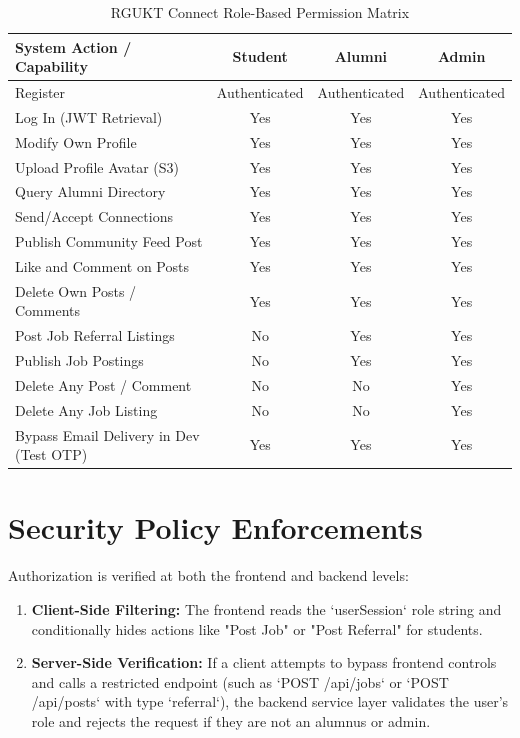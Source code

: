 \begin{table}[H]
    \centering
    \caption{RGUKT Connect Role-Based Permission Matrix}
    \label{tab:permission_matrix}
    \begin{tabularx}{\textwidth}{l c c c}
        \toprule
        \textbf{System Action / Capability} & \textbf{Student} & \textbf{Alumni} & \textbf{Admin} \\
        \midrule
        Register & Authenticated & Authenticated & Authenticated \\
        Log In (JWT Retrieval) & Yes & Yes & Yes \\
        Modify Own Profile & Yes & Yes & Yes \\
        Upload Profile Avatar (S3) & Yes & Yes & Yes \\
        Query Alumni Directory & Yes & Yes & Yes \\
        Send/Accept Connections & Yes & Yes & Yes \\
        Publish Community Feed Post & Yes & Yes & Yes \\
        Like and Comment on Posts & Yes & Yes & Yes \\
        Delete Own Posts / Comments & Yes & Yes & Yes \\
        Post Job Referral Listings & No & Yes & Yes \\
        Publish Job Postings & No & Yes & Yes \\
        Delete Any Post / Comment & No & No & Yes \\
        Delete Any Job Listing & No & No & Yes \\
        Bypass Email Delivery in Dev (Test OTP) & Yes & Yes & Yes \\
        \bottomrule
    \end{tabularx}
\end{table}

\section{Security Policy Enforcements}
Authorization is verified at both the frontend and backend levels:
\begin{enumerate}
    \item \textbf{Client-Side Filtering:} The frontend reads the `userSession` role string and conditionally hides actions like "Post Job" or "Post Referral" for students.
    \item \textbf{Server-Side Verification:} If a client attempts to bypass frontend controls and calls a restricted endpoint (such as `POST /api/jobs` or `POST /api/posts` with type `referral`), the backend service layer validates the user's role and rejects the request if they are not an alumnus or admin.
\end{enumerate}
